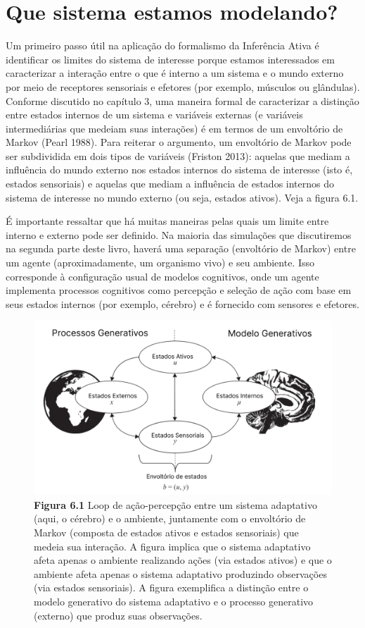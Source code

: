 \documentclass[
  12pt,
]{book}
\begin{document}
\hypertarget{que-sistema-estamos-modelando}{%
\section{Que sistema estamos modelando?}\label{que-sistema-estamos-modelando}}

Um primeiro passo útil na aplicação do formalismo da Inferência Ativa é identificar os limites do sistema de interesse porque estamos interessados em caracterizar a interação entre o que é interno a um sistema e o mundo externo por meio de receptores sensoriais e efetores (por exemplo, músculos ou glândulas). Conforme discutido no capítulo 3, uma maneira formal de caracterizar a distinção entre estados internos de um sistema e variáveis externas (e variáveis intermediárias que medeiam suas interações) é em termos de um envoltório de Markov (Pearl 1988). Para reiterar o argumento, um envoltório de Markov pode ser subdividida em dois tipos de variáveis (Friston 2013): aquelas que mediam a influência do mundo externo nos estados internos do sistema de interesse (isto é, estados sensoriais) e aquelas que mediam a influência de estados internos do sistema de interesse no mundo externo (ou seja, estados ativos). Veja a figura 6.1.

É importante ressaltar que há muitas maneiras pelas quais um limite entre interno e externo pode ser definido. Na maioria das simulações que discutiremos na segunda parte deste livro, haverá uma separação (envoltório de Markov) entre um agente (aproximadamente, um organismo vivo) e seu ambiente. Isso corresponde à configuração usual de modelos cognitivos, onde um agente implementa processos cognitivos como percepção e seleção de ação com base em seus estados internos (por exemplo, cérebro) e é fornecido com sensores e efetores.

\begin{figure}
\centering
\includegraphics{images/Figura_6_1.png}
\caption{\textbf{Figura 6.1} Loop de ação-percepção entre um sistema adaptativo (aqui, o cérebro) e o ambiente, juntamente com o envoltório de Markov (composta de estados ativos e estados sensoriais) que medeia sua interação. A figura implica que o sistema adaptativo afeta apenas o ambiente realizando ações (via estados ativos) e que o ambiente afeta apenas o sistema adaptativo produzindo observações (via estados sensoriais). A figura exemplifica a distinção entre o modelo generativo do sistema adaptativo e o processo generativo (externo) que produz suas observações.}
\end{figure}
\end{document}
